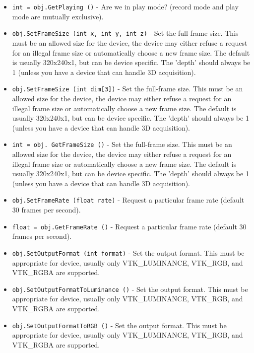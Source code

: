 \begin{itemize}
\item  \verb|int = obj.GetPlaying ()| -  Are we in play mode? (record mode and play mode are mutually
 exclusive).

\item  \verb|obj.SetFrameSize (int x, int y, int z)| -  Set the full-frame size.  This must be an allowed size for the device,
 the device may either refuse a request for an illegal frame size or
 automatically choose a new frame size.
 The default is usually 320x240x1, but can be device specific.  
 The 'depth' should always be 1 (unless you have a device that
 can handle 3D acquisition).

\item  \verb|obj.SetFrameSize (int dim[3])| -  Set the full-frame size.  This must be an allowed size for the device,
 the device may either refuse a request for an illegal frame size or
 automatically choose a new frame size.
 The default is usually 320x240x1, but can be device specific.  
 The 'depth' should always be 1 (unless you have a device that
 can handle 3D acquisition).

\item  \verb|int = obj. GetFrameSize ()| -  Set the full-frame size.  This must be an allowed size for the device,
 the device may either refuse a request for an illegal frame size or
 automatically choose a new frame size.
 The default is usually 320x240x1, but can be device specific.  
 The 'depth' should always be 1 (unless you have a device that
 can handle 3D acquisition).

\item  \verb|obj.SetFrameRate (float rate)| -  Request a particular frame rate (default 30 frames per second).

\item  \verb|float = obj.GetFrameRate ()| -  Request a particular frame rate (default 30 frames per second).

\item  \verb|obj.SetOutputFormat (int format)| -  Set the output format.  This must be appropriate for device,
 usually only VTK\_LUMINANCE, VTK\_RGB, and VTK\_RGBA are supported.

\item  \verb|obj.SetOutputFormatToLuminance ()| -  Set the output format.  This must be appropriate for device,
 usually only VTK\_LUMINANCE, VTK\_RGB, and VTK\_RGBA are supported.

\item  \verb|obj.SetOutputFormatToRGB ()| -  Set the output format.  This must be appropriate for device,
 usually only VTK\_LUMINANCE, VTK\_RGB, and VTK\_RGBA are supported.


\end{itemize}
